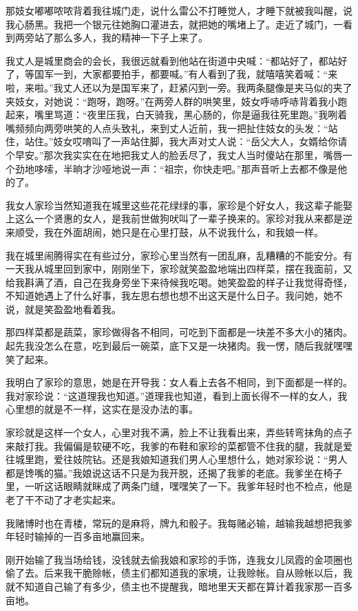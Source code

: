 \documentclass[12pt,UTF8]{ctexbook}
\begin{document}
那妓女嘟嘟哝哝背着我往城门走，说什么雷公不打睡觉人，才睡下就被我叫醒，说我心肠黑。我把一个银元往她胸口灌进去，就把她的嘴堵上了。走近了城门，一看到两旁站了那么多人，我的精神一下子上来了。

我丈人是城里商会的会长，我很远就看到他站在街道中央喊：“都站好了，都站好了，等国军一到，大家都要拍手，都要喊。”有人看到了我，就嘻嘻笑着喊：“来啦，来啦。”我丈人还以为是国军来了，赶紧闪到一旁。我两条腿像是夹马似的夹了夹妓女，对她说：“跑呀，跑呀。”在两旁人群的哄笑里，妓女呼哧呼哧背着我小跑起来，嘴里骂道：“夜里压我，白天骑我，黑心肠的，你是逼我往死里跑。”我咧着嘴频频向两旁哄笑的人点头致礼，来到丈人近前，我一把扯住妓女的头发：“站住，站住。”妓女哎唷叫了一声站住脚，我大声对丈人说：“岳父大人，女婿给你请个早安。”那次我实实在在地把我丈人的脸丢尽了，我丈人当时傻站在那里，嘴唇一个劲地哆嗦，半晌才沙哑地说一声：“祖宗，你快走吧。”那声音听上去都不像是他的了。

我女人家珍当然知道我在城里这些花花绿绿的事，家珍是个好女人，我这辈子能娶上这么一个贤惠的女人，是我前世做狗吠叫了一辈子换来的。家珍对我从来都是逆来顺受，我在外面胡闹，她只是在心里打鼓，从不说我什么，和我娘一样。

我在城里闹腾得实在有些过分，家珍心里当然有一团乱麻，乱糟糟的不能安分。有一天我从城里回到家中，刚刚坐下，家珍就笑盈盈地端出四样菜，摆在我面前，又给我斟满了酒，自己在我身旁坐下来待候我吃喝。她笑盈盈的样子让我觉得奇怪，不知道她遇上了什么好事，我左思右想也想不出这天是什么日子。我问她，她不说，就是笑盈盈地看着我。

那四样菜都是蔬菜，家珍做得各不相同，可吃到下面都是一块差不多大小的猪肉。起先我没怎么在意，吃到最后一碗菜，底下又是一块猪肉。我一愣，随后我就嘿嘿笑了起来。

我明白了家珍的意思，她是在开导我：女人看上去各不相同，到下面都是一样的。我对家珍说：“这道理我也知道。”道理我也知道，看到上面长得不一样的女人，我心里想的就是不一样，这实在是没办法的事。

家珍就是这样一个女人，心里对我不满，脸上不让我看出来，弄些转弯抹角的点子来敲打我。我偏偏是软硬不吃，我爹的布鞋和家珍的菜都管不住我的腿，我就是爱往城里跑，爱往妓院钻。还是我娘知道我们男人心里想什么，她对家珍说：“男人都是馋嘴的猫。”我娘说这话不只是为我开脱，还揭了我爹的老底。我爹坐在椅子里，一听这话眼睛就眯成了两条门缝，嘿嘿笑了一下。我爹年轻时也不检点，他是老了干不动了才老实起来。

我赌博时也在青楼，常玩的是麻将，牌九和骰子。我每赌必输，越输我越想把我爹年轻时输掉的一百多亩地赢回来。

刚开始输了我当场给钱，没钱就去偷我娘和家珍的手饰，连我女儿凤霞的金项圈也偷了去。后来我干脆赊帐，债主们都知道我的家境，让我赊帐。自从赊帐以后，我就不知道自己输了有多少，债主也不提醒我，暗地里天天都在算计着我家那一百多亩地。
\end{document}
